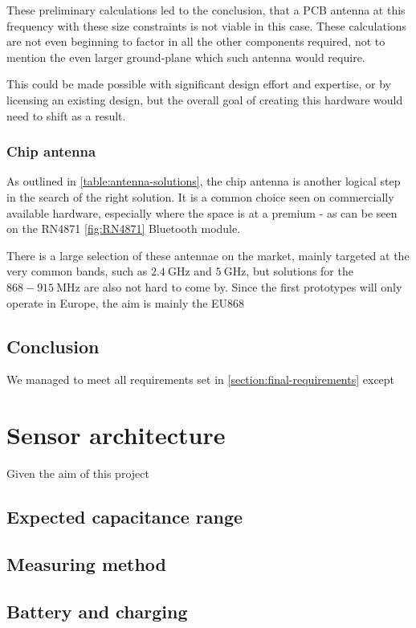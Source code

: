 These preliminary calculations led to the conclusion, that a PCB antenna at this frequency with these size constraints is not viable in this case. These calculations are not even beginning to factor in all the other components required, not to mention the even larger ground-plane which such antenna would require. 

This could be made possible with significant design effort and expertise, or by licensing an existing design, but the overall goal of creating this hardware would need to shift as a result.

\subsubsection{Chip antenna}
As outlined in \ref{table:antenna-solutions}, the chip antenna is another logical step in the search of the right solution. It is a common choice seen on commercially available hardware, especially where the space is at a premium - as can be seen on the RN4871 \ref{fig:RN4871} Bluetooth module.

There is a large selection of these antennae on the market, mainly targeted at the very common bands, such as $2.4~\mathrm{GHz}$ and $5~\mathrm{GHz}$, but solutions for the $868-915~\mathrm{MHz}$ are also not hard to come by. Since the first prototypes will only operate in Europe, the aim is mainly the EU868 

\subsection{Conclusion}
We managed to meet all requirements set in \ref{section:final-requirements} except

\FloatBarrier
\section{Sensor architecture}

Given the aim of this project

\subsection{Expected capacitance range}

\subsection{Measuring method}

\subsection{Battery and charging}
